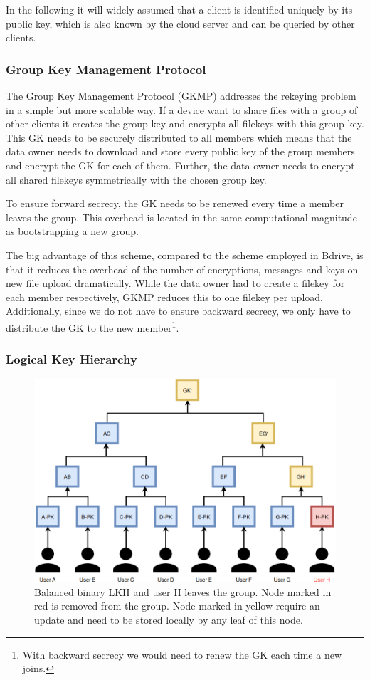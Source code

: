 In the following it will widely assumed that a client is identified uniquely by its public key, which is also known by the cloud server and can be queried by other clients. 

\subsubsection{Group Key Management Protocol}
The Group Key Management Protocol (\ac{GKMP})\cite{harney1997group} addresses the rekeying problem in a simple but more scalable way. If a device want to share files with a group of other clients it creates the group key and encrypts all filekeys with this group key. This \ac{GK} needs to be securely distributed to all members which means that the data owner needs to download and store every public key of the group members and encrypt the \ac{GK} for each of them. Further, the data owner needs to encrypt all shared filekeys symmetrically with the chosen group key. 

To ensure forward secrecy, the \ac{GK} needs to be renewed every time a member leaves the group. This overhead is located in the same computational magnitude as bootstrapping a new group. 

The big advantage of this scheme, compared to the scheme employed in Bdrive, is that it reduces the overhead of the number of encryptions, messages and keys on new file upload dramatically. While the data owner had to create a filekey for each member respectively, \ac{GKMP} reduces this to one filekey per upload. Additionally, since we do not have to ensure backward secrecy, we only have to distribute the \ac{GK} to the new member\footnote{With backward secrecy we would need to renew the GK each time a new joins.}.

\subsubsection{Logical Key Hierarchy}
\begin{figure}[!ht]
\centering
    \includegraphics[width=0.8\linewidth]{img/LKH.png}
    \caption{Balanced binary \ac{LKH} and user H leaves the group. Node marked in red is removed from the group. Node marked in yellow require an update and need to be stored locally by any leaf of this node. }
    \label{fig:lkh}
\end{figure}

